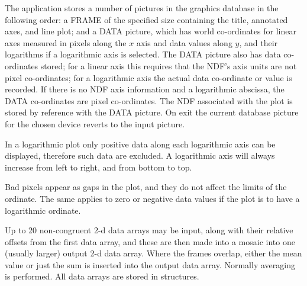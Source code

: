 {{{{         \sstitem
         The application stores a number of pictures in the graphics
         database in the following order: a FRAME of the specified size
         containing the title, annotated axes, and line plot; and a DATA
         picture, which has world co-ordinates for linear axes measured in
         pixels along the $x$ axis and data values along $y$, and their
         logarithms if a logarithmic axis is selected.  The DATA picture
         also has data co-ordinates stored; for a linear axis this
         requires that the NDF's axis units are not pixel co-ordinates;
         for a logarithmic axis the actual data co-ordinate or value is
         recorded.  If there is no NDF axis information and a logarithmic
         abscissa, the DATA co-ordinates are pixel co-ordinates.  The NDF
         associated with the plot is stored by reference with the DATA
         picture.  On exit the current database picture for the chosen
         device reverts to the input picture.

         \sstitem
         In a logarithmic plot only positive data along each
         logarithmic axis can be displayed, therefore such data are
         excluded.  A logarithmic axis will always increase from left to
         right, and from bottom to top.

         \sstitem
         Bad pixels appear as gaps in the plot, and they do not affect
         the limits of the ordinate.  The same applies to zero or negative
         data values if the plot is to have a logarithmic ordinate.
      }
   }
   \newpage
}

\begin{manroutinedescription}
  Up to 20 non-congruent 2-d data arrays may be input, along with
  their relative offsets from the first data array, and these are
  then made into a mosaic into one (usually larger) output 2-d data
  array. Where the frames overlap, either the mean value or just the
  sum is inserted into the output data array. Normally averaging is
  performed. All data arrays are stored in {} structures.


\end{manroutinedescription}}
